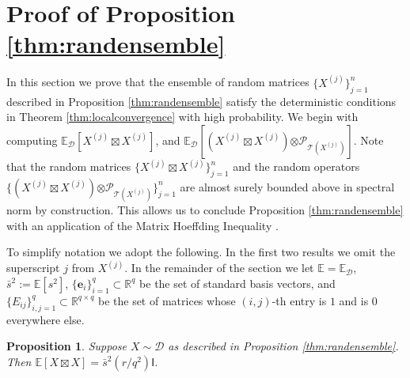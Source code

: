 \documentclass[11pt,letterpaper]{article}
\newtheorem{proposition}[theorem]{Proposition}
\newcommand{\R}{\mathbb{R}}
\newcommand{\be}{\mathbf{e}}
\newcommand{\botimes}{\boldsymbol \otimes}
\newcommand{\ct}{\mathcal{T}}
\newcommand{\cp}{\mathcal{P}}
\newcommand{\sfi}{\mathsf{I}}
\begin{document}
%

\section{Proof of Proposition \ref{thm:randensemble}} \label{apx:randensemble}

In this section we prove that the ensemble of random matrices $\bigl\{X^{(j)}\bigr\}_{j=1}^{n}$ described in Proposition \ref{thm:randensemble} satisfy the deterministic conditions in Theorem \ref{thm:localconvergence} with high probability.  We begin with computing $\mathbb{E}_{\mathcal{D}} [X^{(j)} \boxtimes X^{(j)}]$, and $\mathbb{E}_{\mathcal{D}} [(X^{(j)} \boxtimes X^{(j)}) \botimes \cp_{\ct(X^{(j)})}]$.  Note that the random matrices $\{X^{(j)} \boxtimes X^{(j)}\}_{j=1}^{n}$ and the random operators $\{(X^{(j)} \boxtimes X^{(j)}) \botimes \cp_{\ct(X^{(j)})}\}_{j=1}^{n}$ are almost surely bounded above in spectral norm by construction.  This allows us to conclude Proposition \ref{thm:randensemble} with an application of the Matrix Hoeffding Inequality \cite{Tro:12}.


To simplify notation we adopt the following.  In the first two results we omit the superscript $j$ from $X^{(j)}$.  In the remainder of the section we let $\mathbb{E}=\mathbb{E}_{\mathcal{D}}$, $\bar{s}^2 := \mathbb{E} [s^2]$, $\{\be_i\}_{i=1}^{q} \subset \R^q$ be the set of standard basis vectors, and $\{E_{ij}\}_{i,j=1}^{q} \subset \mathbb{R}^{q\times q}$ be the set of matrices whose $(i,j)$-th entry is $1$ and is $0$ everywhere else.


\begin{proposition}\label{thm:xxmean}
	Suppose $X\sim\mathcal{D}$ as described in Proposition \ref{thm:randensemble}.  Then $\mathbb{E}[X \boxtimes X] = \bar{s}^2 (r/q^2) \sfi$.
\end{proposition}
\end{document}
